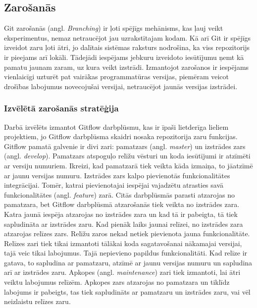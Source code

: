 \subsection{Zarošanās}
Git zarošanās (angl. \textit{Branching}) ir ļoti spējīgs mehānisms, kas ļauj veikt eksperimentus, nemaz netraucējot jau uzrakstītajam kodam. Kā arī Git ir spējīgs izveidot zaru ļoti ātri, jo dalītais sistēmas raksturs nodrošina, ka viss repozitorijs ir pieejams arī lokāli. Tādejādi iespējams jebkuru izveidoto iesūtījumu ņemt kā pamatu jaunam zaram, uz kura veikt izstrādi. Izmantojot zarošanos ir iespējams vienlaicīgi uzturēt pat vairākas programmatūras versijas, piemēram veicot drošības labojumus novecojušai versijai, netraucējot jaunās versijas izstrādei.
\subsubsection{Izvēlētā zarošanās stratēģija}
Darbā izvēlēts izmantot Gitflow darbplūsmu, kas ir īpaši lietderīga lieliem projektiem, jo Gitflow darbplūsma skaidri nosaka repozitorija zaru funkcijas. Gitflow pamatā galvenie ir divi zari: pamatzars (angl. \textit{master}) un izstrādes zars (angl. \textit{develop}). Pamatzars atspoguļo relīžu vēsturi un koda iesūtījumi ir atzīmēti ar versiju numuriem. Ikreizi, kad pamatzarā tiek veikta kāda izmaiņa, to jāatzīmē ar jaunu versijas numuru. Izstrādes zars kalpo pievienotās funkcionalitātes integrācijai. Tomēr, katrai pievienotajai iespējai vajadzētu atrasties savā funkcionalitātes (angl. \textit{feature}) zarā. Citās darbplūsmās parasti atzarojas no pamatzara, bet Gitflow darbplūsmā atzarošanās tiek veikta no izstrādes zara. Katra jaunā iespēja atzarojas no izstrādes zara un kad tā ir pabeigta, tā tiek sapludināta ar izstrādes zaru.
Kad pienāk laiks jaunai relīzei, no izstrādes zara atzarojas relīzes zars. Relīžu zaros nekad netiek pievienota jauna funkcionalitāte. Relīzes zari tiek tikai izmantoti tālākai koda sagatavošanai nākamajai versijai, tajā veic tikai labojumus. Tajā nepievieno papildus funkcionalitāti. Kad relīze ir gatava, to sapludina ar pamatzaru, atzīmē ar jaunu versijas numuru un sapludina arī ar izstrādes zaru.
Apkopes (angl. \textit{maintenance}) zari tiek izmantoti, lai ātri veiktu labojumus relīzēm. Apkopes zars atzarojas no pamatzara un tiklīdz labojums ir pabeigts, tas tiek sapludināts ar pamatzaru un izstrādes zaru, vai vēl neizlaistu relīzes zaru.


